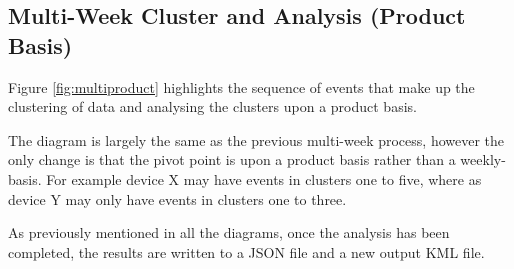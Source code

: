 \newpage
\subsection{Multi-Week Cluster and Analysis (Product Basis)}
Figure \ref{fig:multiproduct} highlights the sequence of events that make up 
the clustering of data and analysing the clusters upon a product basis.

The diagram is largely the same as the previous multi-week process, however the 
only change is that the pivot point is upon a product basis rather than a 
weekly-basis. For example device X may have events in clusters one to five, 
where as device Y may only have events in clusters one to three. 

As previously mentioned in all the diagrams, once the analysis has been 
completed, the results are written to a JSON file and a new output KML file.



